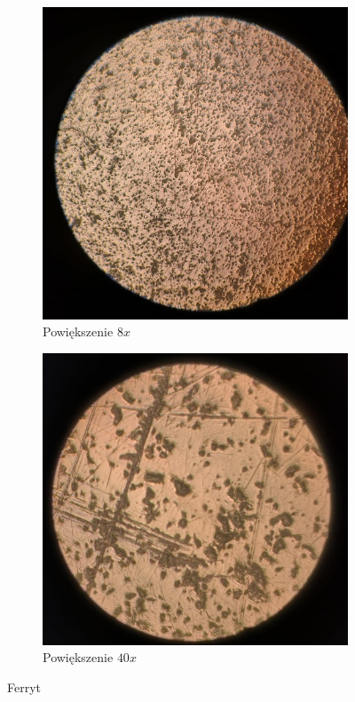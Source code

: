 \begin{figure}[H]
    \begin{subfigure}{.5\textwidth}
        \centering
        \includegraphics[width=.8\linewidth]{img/ferryt8.jpg}  
        \caption{Powiększenie $8x$}
    \end{subfigure}
    \begin{subfigure}{.5\textwidth}
        \centering
        \includegraphics[width=.8\linewidth]{img/ferryt40.jpg}  
        \caption{Powiększenie $40x$}
    \end{subfigure}
    \caption{Ferryt}
\end{figure}

